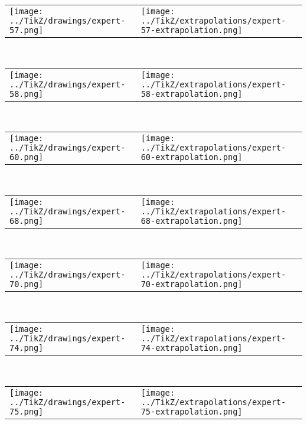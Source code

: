             \begin{tabular}{ll}
    \texttt{[image: ../TikZ/drawings/expert-57.png]}&
    \texttt{[image: ../TikZ/extrapolations/expert-57-extrapolation.png]}
    \end{tabular}        
            \\

            \begin{tabular}{ll}
    \texttt{[image: ../TikZ/drawings/expert-58.png]}&
    \texttt{[image: ../TikZ/extrapolations/expert-58-extrapolation.png]}
    \end{tabular}        
            \\

            \begin{tabular}{ll}
    \texttt{[image: ../TikZ/drawings/expert-60.png]}&
    \texttt{[image: ../TikZ/extrapolations/expert-60-extrapolation.png]}
    \end{tabular}        
            \\

            \begin{tabular}{ll}
    \texttt{[image: ../TikZ/drawings/expert-68.png]}&
    \texttt{[image: ../TikZ/extrapolations/expert-68-extrapolation.png]}
    \end{tabular}        
            \\

            \begin{tabular}{ll}
    \texttt{[image: ../TikZ/drawings/expert-70.png]}&
    \texttt{[image: ../TikZ/extrapolations/expert-70-extrapolation.png]}
    \end{tabular}        
            \\

            \begin{tabular}{ll}
    \texttt{[image: ../TikZ/drawings/expert-74.png]}&
    \texttt{[image: ../TikZ/extrapolations/expert-74-extrapolation.png]}
    \end{tabular}        
            \\

            \begin{tabular}{ll}
    \texttt{[image: ../TikZ/drawings/expert-75.png]}&
    \texttt{[image: ../TikZ/extrapolations/expert-75-extrapolation.png]}
    \end{tabular}        
            \\

